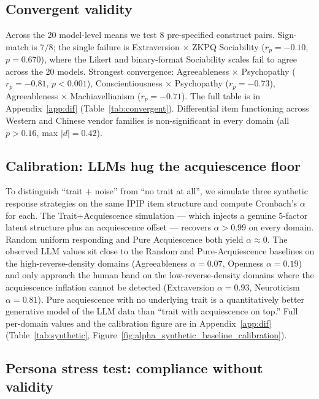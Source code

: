 \documentclass[11pt]{article}
\begin{document}
\subsection{Convergent validity}
\label{sec:results-convergent}

Across the 20 model-level means we test 8 pre-specified construct pairs. Sign-match is $7/8$; the single failure is Extraversion $\times$ ZKPQ Sociability ($r_p = -0.10$, $p = 0.670$), where the Likert and binary-format Sociability scales fail to agree across the 20 models. Strongest convergence: Agreeableness $\times$ Psychopathy ($r_p = -0.81$, $p<0.001$), Conscientiousness $\times$ Psychopathy ($r_p = -0.73$), Agreeableness $\times$ Machiavellianism ($r_p = -0.71$). The full table is in Appendix~\ref{app:dif} (Table~\ref{tab:convergent}). Differential item functioning across Western and Chinese vendor families is non-significant in every domain (all $p > 0.16$, max $|d| = 0.42$).

\subsection{Calibration: LLMs hug the acquiescence floor}
\label{sec:results-calibration}

To distinguish ``trait $+$ noise'' from ``no trait at all'', we simulate three synthetic response strategies on the same IPIP item structure and compute Cronbach's $\alpha$ for each. The Trait+Acquiescence simulation --- which injects a genuine 5-factor latent structure plus an acquiescence offset --- recovers $\alpha > 0.99$ on every domain. Random uniform responding and Pure Acquiescence both yield $\alpha \approx 0$. The observed LLM values sit close to the Random and Pure-Acquiescence baselines on the high-reverse-density domains (Agreeableness $\alpha=0.07$, Openness $\alpha=0.19$) and only approach the human band on the low-reverse-density domains where the acquiescence inflation cannot be detected (Extraversion $\alpha=0.93$, Neuroticism $\alpha=0.81$). Pure acquiescence with no underlying trait is a quantitatively better generative model of the LLM data than ``trait with acquiescence on top.'' Full per-domain values and the calibration figure are in Appendix~\ref{app:dif} (Table~\ref{tab:synthetic}, Figure~\ref{fig:alpha_synthetic_baseline_calibration}).

\subsection{Persona stress test: compliance without validity}
\label{sec:results-persona}
\end{document}
